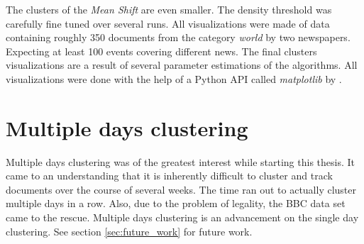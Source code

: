The clusters of the \emph{Mean Shift} are even smaller. The density threshold was carefully fine tuned over several runs. All visualizations were made of data containing roughly 350 documents from the category \emph{world} by two newspapers. Expecting at least 100 events covering different news. The final clusters visualizations are a result of several parameter estimations of the algorithms. All visualizations were done with the help of a Python API called \emph{matplotlib} by \cite{MatPlotHunter2007}.

\section{Multiple days clustering}
  Multiple days clustering was of the greatest interest while starting this thesis. It came to an understanding that it is inherently difficult to cluster and track documents over the course of several weeks. The time ran out to actually cluster multiple days in a row. Also, due to the problem of legality, the BBC data set came to the rescue. Multiple days clustering is an advancement on the single day clustering. See section \ref{sec:future_work} for future work.



